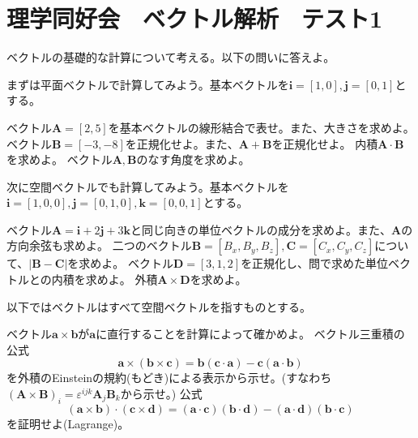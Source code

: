 \documentclass[a4j,dvipdfmx]{jsarticle}
\begin{document}
    \part*{理学同好会　ベクトル解析　テスト1}
        ベクトルの基礎的な計算について考える。以下の問いに答えよ。
        \begin{qparts}
            \qpart まずは平面ベクトルで計算してみよう。基本ベクトルを$\bm{i}=[1,0],\bm{j}=[0,1]$とする。
            \begin{qlist}
                \qitem ベクトル$\bm{A}=[2,5]$を基本ベクトルの線形結合で表せ。また、大きさを求めよ。
                \qitem ベクトル$\bm{B}=[-3,-8]$を正規化せよ。また、$\bm{A}+\bm{B}$を正規化せよ。
                \qitem 内積$\bm{A}\cdot \bm{B}$を求めよ。
                \qitem ベクトル$\bm{A},\bm{B}$のなす角度を求めよ。
            \end{qlist}
            \qpart 次に空間ベクトルでも計算してみよう。基本ベクトルを$\bm{i}=[1,0,0],\bm{j}=[0,1,0],\bm{k}=[0,0,1]$とする。
            \begin{qlist}
                \qitem ベクトル$\bm{A}=\bm{i}+2\bm{j}+3\bm{k}$と同じ向きの単位ベクトルの成分を求めよ。また、$\bm{A}$の方向余弦も求めよ。\label{q:1ii5}
                \qitem 二つのベクトル$\bm{B}=[B_x,B_y,B_z],\bm{C}=[C_x,C_y,C_z]$について、$|\bm{B}-\bm{C}|$を求めよ。
                \qitem ベクトル$\bm{D}=[3,1,2]$を正規化し、問で求めた単位ベクトルとの内積を求めよ。
                \qitem 外積$\bm{A}\times \bm{D}$を求めよ。
            \end{qlist}
            \qpart 以下ではベクトルはすべて空間ベクトルを指すものとする。
            \begin{qlist}
                \qitem ベクトル$\bm{a}\times \bm{b}$が$\bm{a}$に直行することを計算によって確かめよ。
                \qitem ベクトル三重積の公式
                \begin{equation}
                    \bm{a}\times(\bm{b}\times\bm{c})=\bm{b}(\bm{c}\cdot\bm{a})-\bm{c}(\bm{a}\cdot\bm{b})
                \end{equation}
                を外積のEinsteinの規約(もどき)による表示から示せ。(すなわち$(\bm{A}\times\bm{B})_i=\varepsilon^{ijk}\bm{A}_j\bm{B}_k$から示せ。)
                \qitem 公式
                \begin{equation}
                    (\bm{a}\times\bm{b})\cdot(\bm{c}\times\bm{d}) = (\bm{a}\cdot\bm{c})(\bm{b}\cdot\bm{d})-(\bm{a}\cdot\bm{d})(\bm{b}\cdot\bm{c})
                \end{equation}
                を証明せよ(Lagrange)。
            \end{qlist}
        \end{qparts}
\end{document}
